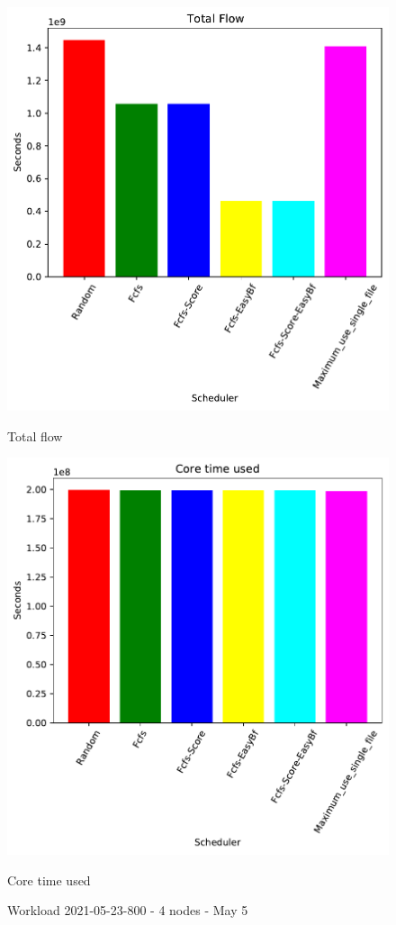 \documentclass[a4paper]{article}
\begin{document}
\begin{figure}[H]
	\begin{minipage}[b]{0.5\linewidth}\centering\includegraphics[width=1\linewidth]{MBSS/plot/2021-05-23-800_Total_flow4nodes.pdf}\caption{Total flow}\vspace{4ex}\end{minipage}
	\begin{minipage}[b]{0.5\linewidth}\centering\includegraphics[width=1\linewidth]{MBSS/plot/2021-05-23-800_Core_time_used4nodes.pdf}\caption{Core time used}\vspace{4ex}\end{minipage}\caption{Workload 2021-05-23-800 - 4 nodes - May 5}\end{figure}
\end{document}
